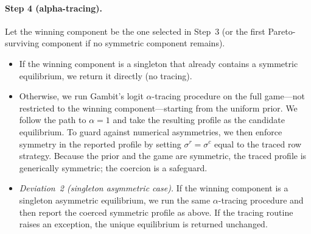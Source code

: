 \paragraph{Step 4 (alpha-tracing).}
Let the winning component be the one selected in Step~3 (or the
first Pareto-surviving component if no symmetric component remains).
\begin{itemize}
\item If the winning component is a singleton that already contains a
symmetric equilibrium, we return it directly (no tracing).
\item Otherwise, we run Gambit's logit $\alpha$-tracing procedure on the full game---not restricted to the winning component---starting from the uniform prior. 
We follow the path to $\alpha=1$ and take the resulting profile as the candidate equilibrium. 
To guard against numerical asymmetries, we then enforce symmetry in the reported profile by setting $\sigma^{r}=\sigma^{c}$ equal to the traced row strategy.
Because the prior and the game are symmetric, the traced profile is generically symmetric; the coercion is a safeguard.
\item \emph{Deviation~2 (singleton asymmetric case).} If the winning
component is a singleton asymmetric equilibrium, we run the same
$\alpha$-tracing procedure and then report the coerced symmetric profile as above. 
If the tracing routine raises an exception, the unique equilibrium is returned unchanged.
\end{itemize}

\renewcommand{\thefigure}{D\arabic{figure}} 
\setcounter{figure}{0}  

\renewcommand{\thetable}{D\arabic{table}} 
\setcounter{table}{0}  
